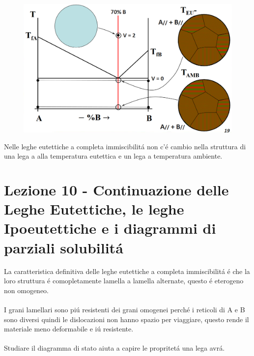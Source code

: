 \documentclass{article}
\begin{document}
{             \begin{figure}[!h]
                \centering
                \includegraphics[width=.85\linewidth]{Cambio di struttura tra dopo eutettica e temperature ambiente in un sistema esemplare di metalli completamente immiscibili.png}
            \end{figure}
             Nelle leghe eutettiche a completa immiscibilit\'a non c'\'e cambio nella struttura di una lega a alla temperatura eutettica e un lega a temperatura ambiente.
    \newpage
    \section{Lezione 10 - Continuazione delle Leghe Eutettiche, le leghe Ipoeutettiche e i diagrammi di parziali solubilit\'a}
        La caratteristica definitiva delle leghe eutettiche a completa immiscibilit\'a \'e che la loro struttura \'e comopletamente lamella a lamella alternate, questo \'e eterogeno non omogeneo.\\ \\
        I grani lamellari sono pi\'u resistenti dei grani omogenei perch\'e i reticoli di A e B sono diversi quindi le dislocazioni non hanno spazio per viaggiare, questo rende il materiale meno deformabile e i\'u resistente.\\ \\
        Studiare il diagramma di stato aiuta a capire le propritet\'a una lega avr\'a.
}
\end{document}
